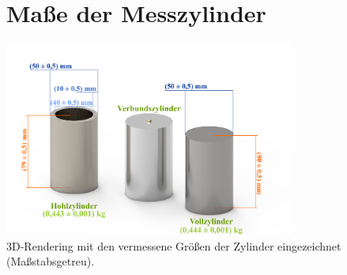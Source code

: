 \begin{figure}[!ht]
    \section{Maße der Messzylinder}
    \centering
    \includegraphics[width=0.85\textwidth]{img/15/Zylindermasse.pdf}
    \caption{3D-Rendering mit den vermessene Größen der Zylinder eingezeichnet (Maßstabsgetreu).}
    \label{fig:zylinder_masse}
\end{figure}
\twocolumn